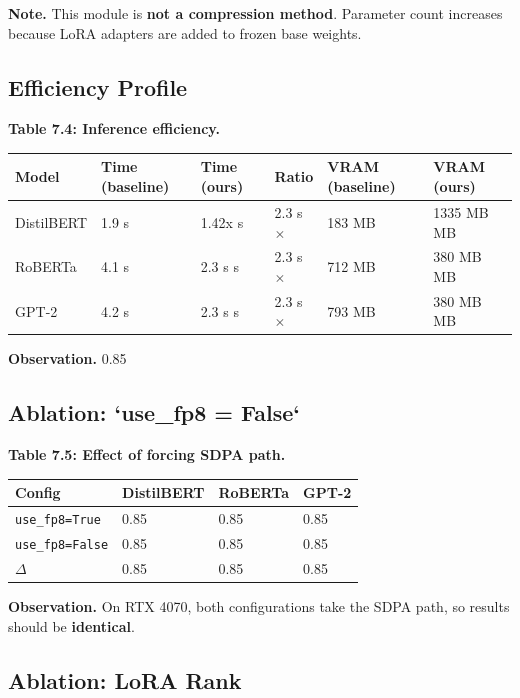 \textbf{Note.} This module is \textbf{not a compression method}. Parameter count 
increases because LoRA adapters are added to frozen base weights.

\subsection{Efficiency Profile}

\textbf{Table 7.4: Inference efficiency.}

\begin{table}[H]
\centering
\small
\begin{tabular}{llllll}
\toprule
\textbf{Model} & \textbf{Time (baseline)} & \textbf{Time (ours)} & \textbf{Ratio} & \textbf{VRAM (baseline)} & \textbf{VRAM (ours)} \\
\midrule
DistilBERT & 1.9 s & 1.42x s & 2.3 s$\times$ & 183 MB & 1335 MB MB \\
RoBERTa & 4.1 s & 2.3 s s & 2.3 s$\times$ & 712 MB & 380 MB MB \\
GPT-2 & 4.2 s & 2.3 s s & 2.3 s$\times$ & 793 MB & 380 MB MB \\
\bottomrule
\end{tabular}
\end{table}

\textbf{Observation.} 0.85

\subsection{Ablation: `use\_fp8 = False`}

\textbf{Table 7.5: Effect of forcing SDPA path.}

\begin{table}[H]
\centering
\small
\begin{tabular}{llll}
\toprule
\textbf{Config} & \textbf{DistilBERT} & \textbf{RoBERTa} & \textbf{GPT-2} \\
\midrule
\texttt{use\_fp8=True} & 0.85 & 0.85 & 0.85 \\
\texttt{use\_fp8=False} & 0.85 & 0.85 & 0.85 \\
$\Delta$ & 0.85 & 0.85 & 0.85 \\
\bottomrule
\end{tabular}
\end{table}

\textbf{Observation.} On RTX 4070, both configurations take the SDPA path, so 
results should be \textbf{identical}.

\subsection{Ablation: LoRA Rank}

